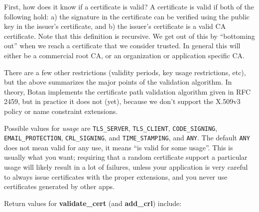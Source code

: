 \documentclass{article}
\newcommand{\function}[1]{\textbf{#1}}
\newcommand{\type}[1]{\texttt{#1}}
\renewcommand{\arg}[1]{\textsl{#1}}
\begin{document}
First, how does it know if a certificate is valid? A certificate is
valid if both of the following hold: a) the signature in the
certificate can be verified using the public key in the issuer's
certificate, and b) the issuer's certificate is a valid CA
certificate. Note that this definition is recursive. We get out of
this by ``bottoming out'' when we reach a certificate that we consider
trusted. In general this will either be a commercial root CA, or an
organization or application specific CA.

There are a few other restrictions (validity periods, key usage
restrictions, etc), but the above summarizes the major points of the
validation algorithm. In theory, Botan implements the certificate path
validation algorithm given in RFC 2459, but in practice it does not
(yet), because we don't support the X.509v3 policy or name constraint
extensions.

Possible values for \arg{usage} are \type{TLS\_SERVER},
\type{TLS\_CLIENT}, \type{CODE\_SIGNING}, \type{EMAIL\_PROTECTION},
\type{CRL\_SIGNING}, and \type{TIME\_STAMPING}, and \type{ANY}. The
default \type{ANY} does not mean valid for any use, it means ``is
valid for some usage''. This is usually what you want; requiring that
a random certificate support a particular usage will likely result in
a lot of failures, unless your application is very careful to always
issue certificates with the proper extensions, and you never use
certificates generated by other apps.

Return values for \function{validate\_cert} (and \function{add\_crl}) include:
\end{document}
